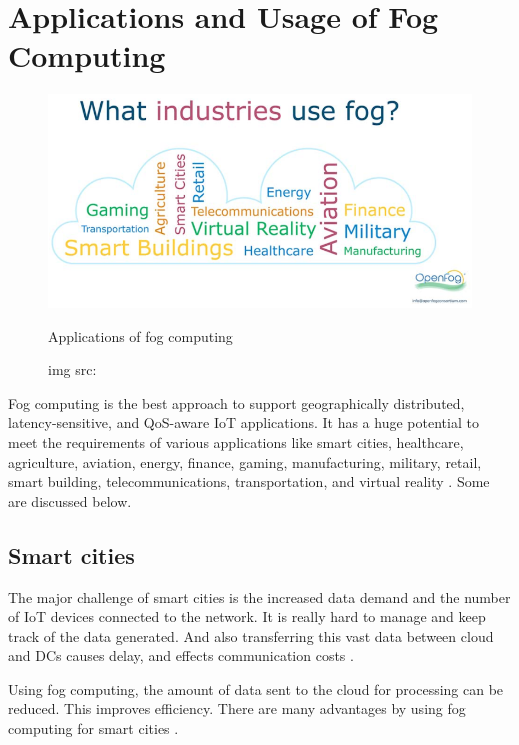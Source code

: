 \section{Applications and Usage of Fog Computing}

\begin{figure}[H]
    \centering
    \includegraphics[width=.5\linewidth]{image/Applications of fog computing.png}
    \caption{Applications of fog computing}
    \caption*{img src: \cite{mukherjee2018survey}}
    \label{fig:applications of fog computing}
\end{figure}

Fog computing is the best approach to support geographically distributed, latency-sensitive, and QoS-aware IoT applications. It has a huge potential to meet the requirements of various applications like smart cities, healthcare, agriculture, aviation, energy, finance, gaming, manufacturing, military, retail, smart building, telecommunications, transportation, and virtual reality \cite{mukherjee2018survey}. Some are discussed below.


\subsection{Smart cities}

The major challenge of smart cities is the increased data demand and the number of IoT devices connected to the network. It is really hard to manage and keep track of the data generated. And also transferring this vast data between cloud and DCs causes delay, and effects communication costs \cite{sandra}. \par

Using fog computing, the amount of data sent to the cloud for processing can be reduced. This improves efficiency. There are many advantages by using fog computing for smart cities \cite{sandra}. \par

